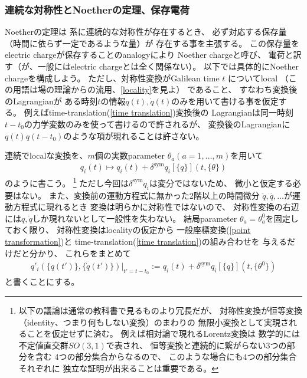\subsubsection{連続な対称性とNoetherの定理、保存電荷}

Noetherの定理は
系に連続的な対称性が存在するとき、
必ず対応する保存量（時間に依らず一定であるような量）が
存在する事を主張する。
この保存量をelectric chargeが保存することのanalogyにより
Noether chargeと呼び、
電荷と訳す（が、一般にはelectric chargeとは全く関係ない）。
以下では具体的にNoether chargeを構成しよう。
ただし、対称性変換がGalilean time $t$
についてlocal
（この用語は場の理論からの流用、\ref{locality}を見よ）
であること、
すなわち変換後のLagrangianが
ある時刻$t$の情報$q(t), \dot{q}(t)$のみを用いて書ける事を仮定する。
例えばtime-translation(\ref{time translation})変換後の
Lagrangianは同一時刻$t - t_0$の力学変数のみを使って書けるので許されるが、
変換後のLagrangianに
$q(t)q(t-t_0)$のような項が現れることは許さない。

連続でlocalな変換を、$m$個の実数parameter
$\theta_a (a=1,\dots,m)$を用いて
\begin{align}
  q_i(t) \mapsto q_i(t) +
  \delta^{\mathrm{sym}} q_i[\{ q \}] (t, \{\theta\})
\end{align}
のように書こう。
\footnote{
  以下の議論は通常の教科書で見るものより冗長だが、
  対称性変換が恒等変換
  （identity、つまり何もしない変換）のまわりの
  無限小変換として実現されることを仮定せずに済む。
  例えば相対論で現れるLorentz変換は
  数学的には不定値直交群$SO(3,1)$で表され、
  恒等変換と連続的に繋がらない$3$つの部分を含む
  $4$つの部分集合からなるので、
  このような場合にも$4$つの部分集合それぞれに
  独立な証明が出来ることは重要である。
}
ただし今回は$\delta^{\mathrm{sym}} q_i$は変分ではないため、
微小と仮定する必要はない。
また、変換前の運動方程式に無かった2階以上の時間微分
$\ddot{q}, \dddot{q},\dots$が運動方程式に現れるとき
変換は明らかに対称性ではないので、
対称性変換の右辺には$q, \dot{q}$しか現れないとして一般性を失わない。
結局parameter $\theta_a = \theta_a^0$を固定しておく限り、
対称性変換はlocalityの仮定から
一般座標変換(\ref{point transformation})と
time-translation(\ref{time translation})の組み合わせを
与えるだけだと分かり、
これらをまとめて
\begin{align}
  q'_i( \{ q(t') \}, \{ \dot{q}(t') \} )
    \Big|_{t' = t - t_0}
  := q_i(t) +
  \delta^{\mathrm{sym}} q_i[\{ q \}] (t, \{\theta^0\})
\end{align}
と書くことにする。

